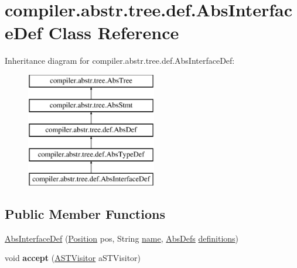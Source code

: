 \hypertarget{classcompiler_1_1abstr_1_1tree_1_1def_1_1_abs_interface_def}{}\section{compiler.\+abstr.\+tree.\+def.\+Abs\+Interface\+Def Class Reference}
\label{classcompiler_1_1abstr_1_1tree_1_1def_1_1_abs_interface_def}
Inheritance diagram for compiler.\+abstr.\+tree.\+def.\+Abs\+Interface\+Def\+:\begin{figure}[H]
\begin{center}
\leavevmode
\includegraphics[height=5.000000cm]{classcompiler_1_1abstr_1_1tree_1_1def_1_1_abs_interface_def}
\end{center}
\end{figure}
\subsection*{Public Member Functions}
\begin{DoxyCompactItemize}
\item 
\hyperlink{classcompiler_1_1abstr_1_1tree_1_1def_1_1_abs_interface_def_a9c696bb3ae71ca6aa776a29bf789c382}{Abs\+Interface\+Def} (\hyperlink{classcompiler_1_1_position}{Position} pos, String \hyperlink{classcompiler_1_1abstr_1_1tree_1_1def_1_1_abs_def_ac6bda9377f5abbb5f1be7d3d1b16481b}{name}, \hyperlink{classcompiler_1_1abstr_1_1tree_1_1_abs_defs}{Abs\+Defs} \hyperlink{classcompiler_1_1abstr_1_1tree_1_1def_1_1_abs_interface_def_a264407486d391f932293c3e96dfc9372}{definitions})
\item 
\mbox{\label{classcompiler_1_1abstr_1_1tree_1_1def_1_1_abs_interface_def_a57f03840160154a9eac65b67adb4c077}} 
void {\bfseries accept} (\hyperlink{interfacecompiler_1_1abstr_1_1_a_s_t_visitor}{A\+S\+T\+Visitor} a\+S\+T\+Visitor)
\end{DoxyCompactItemize}
